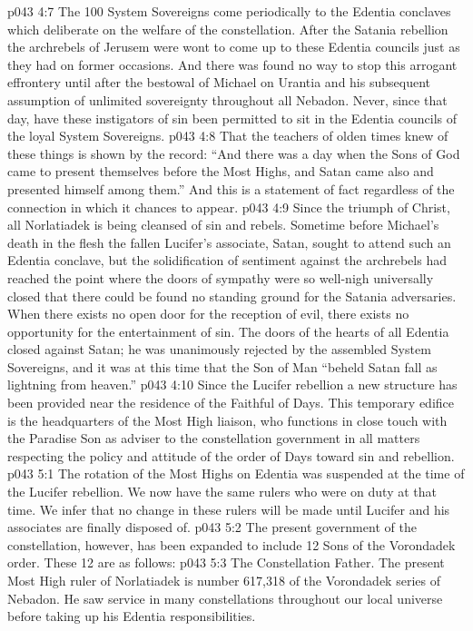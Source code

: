 \vs p043 4:7 \pc The 100 System Sovereigns come periodically to the Edentia conclaves which deliberate on the welfare of the constellation. After the Satania rebellion the archrebels of Jerusem were wont to come up to these Edentia councils just as they had on former occasions. And there was found no way to stop this arrogant effrontery until after the bestowal of Michael on Urantia and his subsequent assumption of unlimited sovereignty throughout all Nebadon. Never, since that day, have these instigators of sin been permitted to sit in the Edentia councils of the loyal System Sovereigns.
\vs p043 4:8 That the teachers of olden times knew of these things is shown by the record: “And there was a day when the Sons of God came to present themselves before the Most Highs, and Satan came also and presented himself among them.” And this is a statement of fact regardless of the connection in which it chances to appear.
\vs p043 4:9 \pc Since the triumph of Christ, all Norlatiadek is being cleansed of sin and rebels. Sometime before Michael’s death in the flesh the fallen Lucifer’s associate, Satan, sought to attend such an Edentia conclave, but the solidification of sentiment against the archrebels had reached the point where the doors of sympathy were so well\hyp{}nigh universally closed that there could be found no standing ground for the Satania adversaries. When there exists no open door for the reception of evil, there exists no opportunity for the entertainment of sin. The doors of the hearts of all Edentia closed against Satan; he was unanimously rejected by the assembled System Sovereigns, and it was at this time that the Son of Man “beheld Satan fall as lightning from heaven.”
\vs p043 4:10 Since the Lucifer rebellion a new structure has been provided near the residence of the Faithful of Days. This temporary edifice is the headquarters of the Most High liaison, who functions in close touch with the Paradise Son as adviser to the constellation government in all matters respecting the policy and attitude of the order of Days toward sin and rebellion.
\vs p043 5:1 The rotation of the Most Highs on Edentia was suspended at the time of the Lucifer rebellion. We now have the same rulers who were on duty at that time. We infer that no change in these rulers will be made until Lucifer and his associates are finally disposed of.
\vs p043 5:2 The present government of the constellation, however, has been expanded to include 12 Sons of the Vorondadek order. These 12 are as follows:
\vs p043 5:3 \bibnobreakspace The Constellation Father. The present Most High ruler of Norlatiadek is number 617,318 of the Vorondadek series of Nebadon. He saw service in many constellations throughout our local universe before taking up his Edentia responsibilities.
